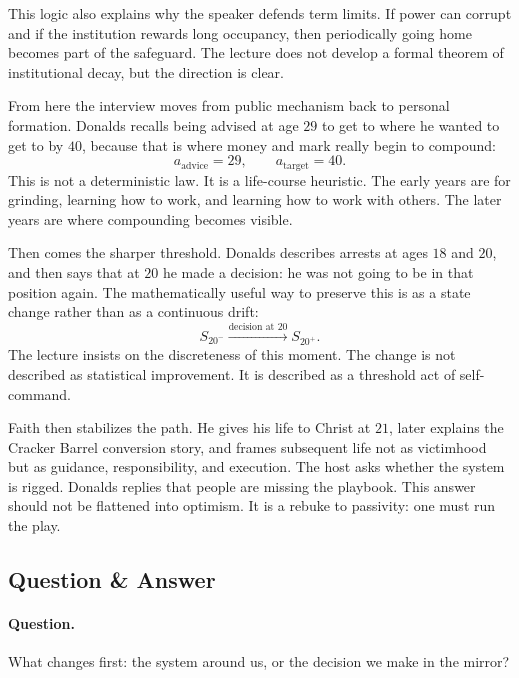 This logic also explains why the speaker defends term limits. If power can corrupt and if the institution rewards long occupancy, then periodically going home becomes part of the safeguard. The lecture does not develop a formal theorem of institutional decay, but the direction is clear.

From here the interview moves from public mechanism back to personal formation. Donalds recalls being advised at age $29$ to get to where he wanted to get to by $40$, because that is where money and mark really begin to compound:
\begin{equation}
a_{\text{advice}}=29,\qquad a_{\text{target}}=40.
\end{equation}
This is not a deterministic law. It is a life-course heuristic. The early years are for grinding, learning how to work, and learning how to work with others. The later years are where compounding becomes visible.

Then comes the sharper threshold. Donalds describes arrests at ages $18$ and $20$, and then says that at $20$ he made a decision: he was not going to be in that position again. The mathematically useful way to preserve this is as a state change rather than as a continuous drift:
\begin{equation}
S_{20^-}\xrightarrow{\text{decision at }20} S_{20^+}.
\end{equation}
The lecture insists on the discreteness of this moment. The change is not described as statistical improvement. It is described as a threshold act of self-command.

Faith then stabilizes the path. He gives his life to Christ at $21$, later explains the Cracker Barrel conversion story, and frames subsequent life not as victimhood but as guidance, responsibility, and execution. The host asks whether the system is rigged. Donalds replies that people are missing the playbook. This answer should not be flattened into optimism. It is a rebuke to passivity: one must run the play.

\subsection{Question \& Answer}

\paragraph{Question.} What changes first: the system around us, or the decision we make in the mirror?

